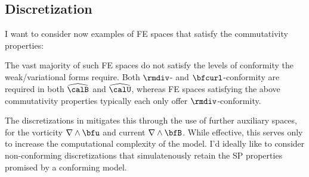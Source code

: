 \subsection*{Discretization}
    \begin{remark}
        I want to consider now examples of FE spaces that satisfy the commutativity properties:
        \begin{center}\end{center}
        The vast majority of such FE spaces do not satisfy the levels of conformity the weak/variational forms require. Both $\rmdiv$- and $\bfcurl$-conformity are required in both $\widehat{\calB}$ and $\widehat{\calU}$, whereas FE spaces satisfying the above commutativity properties typically each only offer $\rmdiv$-conformity.
        
        The discretizations in \cite{Laakmann_Hu_Farrell_2022} mitigates this through the use of further auxiliary spaces, for the vorticity $\nabla\wedge\bfu$ and current $\nabla\wedge\bfB$. While effective, this serves only to increase the computational complexity of the model. I'd ideally like to consider non-conforming discretizations that simulatenously retain the SP properties promised by a conforming model.
    \end{remark}
    